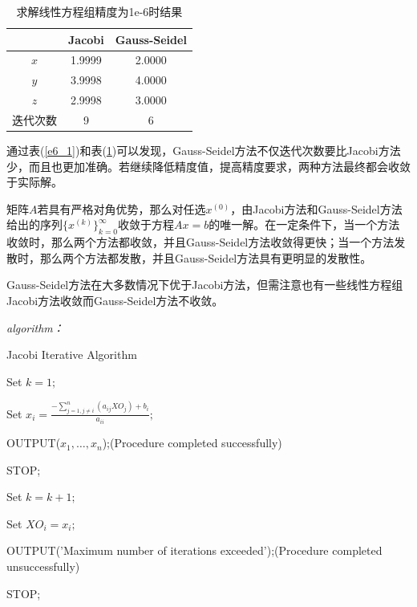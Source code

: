 \documentclass[12pt]{ctexart}
\begin{document}
	\begin{table}[htbp]
		\centering
		\caption{求解线性方程组精度为1e-6时结果}\label{e6_2}
		\begin{tabular}
			{c|c|c}
			\hline
			&Jacobi&Gauss-Seidel \\
			\hline
			$x$&1.9999&2.0000 \\
			\hline
			$y$&3.9998&4.0000 \\
			\hline
			$z$&2.9998&3.0000 \\
			\hline
			迭代次数&9&6 \\
			\hline
		\end{tabular}
	\end{table}
	
	通过表(\ref{e6_1})和表(\ref{e6_2})可以发现，Gauss-Seidel方法不仅迭代次数要比Jacobi方法少，而且也更加准确。若继续降低精度值，提高精度要求，两种方法最终都会收敛于实际解。
	
	矩阵$A$若具有严格对角优势，那么对任选$x^{(0)}$，由Jacobi方法和Gauss-Seidel方法给出的序列$\{x^{(k)}\}_{k=0}^\infty$收敛于方程$Ax=b$的唯一解。在一定条件下，当一个方法收敛时，那么两个方法都收敛，并且Gauss-Seidel方法收敛得更快；当一个方法发散时，那么两个方法都发散，并且Gauss-Seidel方法具有更明显的发散性。
	
	Gauss-Seidel方法在大多数情况下优于Jacobi方法，但需注意也有一些线性方程组Jacobi方法收敛而Gauss-Seidel方法不收敛。
	
	\textit{algorithm：}
	
	\begin{algorithm}
		\caption{Jacobi Iterative Algorithm}
		Set $k=1;$
		
		{
			{
				Set $x_i=\frac{-\sum\limits_{j=1,j\neq i}^{n}(a_{ij}XO_j)+b_i}{a_{ii}};$
			}
		
			{
				OUTPUT($x_1,\dots,x_n$);(Procedure completed successfully)
				
				STOP;
			}
		
			Set $k=k+1;$
			
			{
				Set $XO_i=x_i;$
			}
		}
		
		OUTPUT('Maximum number of iterations exceeded');(Procedure completed unsuccessfully)
		
		STOP;
	\end{algorithm}
\end{document}
